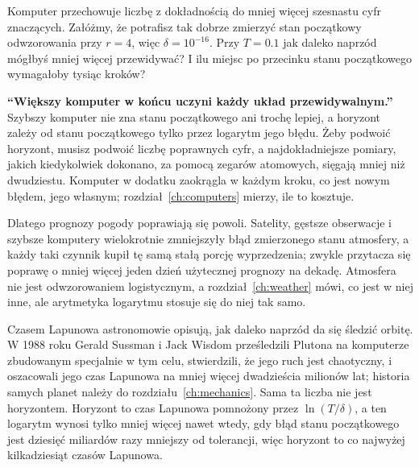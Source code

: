 
\begin{think}
Komputer przechowuje liczbę z dokładnością do mniej więcej szesnastu cyfr
znaczących. Załóżmy, że potrafisz tak dobrze zmierzyć stan początkowy
odwzorowania przy $r = 4$, więc $\delta = 10^{-16}$. Przy $T = \num{0.1}$ jak
daleko naprzód mógłbyś mniej więcej przewidywać? I ilu miejsc po przecinku
stanu początkowego wymagałoby tysiąc kroków?
\end{think}

\begin{trapbox}
\textbf{\enquote{Większy komputer w końcu uczyni każdy układ
przewidywalnym.}} Szybszy komputer nie zna stanu początkowego ani trochę
lepiej, a horyzont zależy od stanu początkowego tylko przez logarytm jego
błędu. Żeby podwoić horyzont, musisz podwoić liczbę poprawnych cyfr, a
najdokładniejsze pomiary, jakich kiedykolwiek dokonano, za pomocą zegarów
atomowych, sięgają mniej niż dwudziestu. Komputer w dodatku zaokrągla w
każdym kroku, co jest nowym błędem, jego własnym;
rozdział~\ref{ch:computers} mierzy, ile to kosztuje.
\end{trapbox}

\noindent
Dlatego prognozy pogody poprawiają się powoli. Satelity, gęstsze obserwacje
i szybsze komputery wielokrotnie zmniejszyły błąd zmierzonego stanu
atmosfery, a każdy taki czynnik kupił tę samą stałą porcję wyprzedzenia;
zwykle przytacza się poprawę o mniej więcej jeden dzień użytecznej prognozy
na dekadę. Atmosfera nie jest odwzorowaniem logistycznym, a
rozdział~\ref{ch:weather} mówi, co jest w niej inne, ale arytmetyka
logarytmu stosuje się do niej tak samo.

\begin{worldbox}
Czasem Lapunowa astronomowie opisują, jak daleko naprzód da się śledzić
orbitę. W 1988 roku Gerald Sussman i Jack Wisdom prześledzili Plutona na
komputerze zbudowanym specjalnie w tym celu, stwierdzili, że jego ruch jest
chaotyczny, i oszacowali jego czas Lapunowa na mniej więcej dwadzieścia
milionów lat; historia samych planet należy do
rozdziału~\ref{ch:mechanics}. Sama ta liczba nie jest horyzontem. Horyzont
to czas Lapunowa pomnożony przez $\ln(T/\delta)$, a ten logarytm wynosi
tylko mniej więcej  nawet wtedy, gdy błąd stanu
początkowego jest dziesięć miliardów razy mniejszy od tolerancji, więc
horyzont to co najwyżej kilkadziesiąt czasów Lapunowa.
\end{worldbox}

